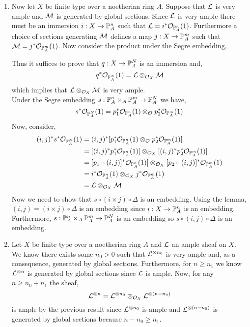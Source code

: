 \documentclass[12pt]{article}
\begin{document}
\begin{enumerate}
\item Now let $X$ be finite type over a noetherian ring $A$. Suppose that $\L$ is very ample and $\M$ is generated by global sections. Since $\L$ is very ample there must be an immersion $i : X \to \P^n_A$ such that $\L = i^* \struct{\P^n_A}(1)$. Furthermore a choice of sections generating $\M$ defines a map $j : X \to \P_A^m$ such that $\M = j^* \struct{\P^m_A}(1)$. Now consider the product under the Segre embedding,
\begin{center}
\end{center} 
Thus it suffices to prove that $q : X \to \P^N_A$ is an immersion and,
\[ q^* \struct{\P^N_A}(1) = \L \otimes_{\struct{X}} \M \]
which implies that $\L \otimes_{\struct{X}} \M$ is very ample. 
\bigskip\\
Under the Segre embedding $s : \P_A^n \times_A \P^m_A \to \P_A^N$ we have,
\[ s^* \struct{\P^N_A}(1) = p_1^* \struct{\P^n_A}(1) \otimes_{\struct{}} p_2^* \struct{\P^m_A}(1) \]
Now, consider,
\begin{align*}
(i, j)^* s^* \struct{\P^N_A}(1) & = (i, j)^* [p_1^* \struct{\P^n_A}(1) \otimes_{\struct{}} p_2^* \struct{\P^m_A}(1)] 
\\
& = [(i, j)^* p_1^* \struct{\P^n_A}(1)] \otimes_{\struct{X}} [(i, j)^*  p_2^* \struct{\P^m_A}(1)] 
\\
& = [p_1 \circ (i, j)]^* \struct{\P^n_A}(1)] \otimes_{\struct{X}} [p_2 \circ (i, j)]^* \struct{\P^m_A}(1)
\\
& = i^* \struct{\P^n_A}(1) \otimes_{\struct{X}} j^* \struct{\P^m_A}(1)
\\
& = \L \otimes_{\struct{X}} \M 
\end{align*}
Now we need to show that $s \circ (i \times j) \circ \Delta$ is an embedding. Using the lemma, $(i, j) = (i \times j) \circ \Delta$ is an embedding since $i : X \to \P^n_A$ is an embedding. Furthermore, $s : \P^n_A \times_A \P^m_A \to \P^N_A$ is an embedding so $s \circ (i, j) \circ \Delta$ is an embedding. 

\item Let $X$ be finite type over a noetherian ring $A$ and $\L$ an ample sheaf on $X$. We know there exists some $n_0 > 0$ such that $\L^{\otimes n_0}$ is very ample and, as a consequence, generated by global sections. Furthermore, for $n \ge n_1$ we know $\L^{\otimes n}$ is generated by global sections since $\L$ is ample. Now, for any $n \ge n_0 + n_1$ the sheaf,
\[ \L^{\otimes n} = \L^{\otimes n_0} \otimes_{\struct{X}} \L^{\otimes (n - n_0)} \] 
is ample by the previous result since $\L^{\otimes n_0}$ is ample and $\L^{\otimes (n - n_0)}$ is generated by global sections because $n - n_0 \ge n_1$.   
\end{enumerate}
\end{document}
